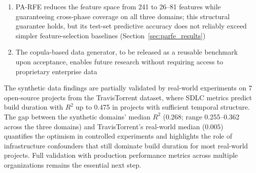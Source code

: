 \documentclass[technologies,article,submit,pdftex,moreauthors]{Definitions/mdpi}
\begin{document}
\begin{enumerate}
  repository age is the \#1 feature in 0 of 7 projects, while Test-phase
  metrics (test duration, test counts, assert density) lead in 5 of 7 --
  no longer a direct real-data contradiction, but a robustness check
  excluding the one Test-phase feature that is definitionally part of
  the build-duration target shows the quantitative signal was doing
  most of the work: with it excluded, every project's holdout \(R^2\)
  turns negative, so this should be read as weak, feature-ranking-only
  corroboration, not confirmation, and it remains a hypothesis pending
  confirmation on a dataset with genuine production-performance (not
  build-duration) targets
\item
  PA-RFE reduces the feature space from 241 to 26--81 features while
  guaranteeing cross-phase coverage on all three domains; this
  structural guarantee holds, but its test-set predictive accuracy does
  not reliably exceed simpler feature-selection baselines (Section~\ref{sec:parfe_results})
\item
  The copula-based data generator, to be released as a reusable
  benchmark upon acceptance, enables future research without requiring
  access to proprietary enterprise data
\end{enumerate}

The synthetic data findings are partially validated by real-world
experiments on 7 open-source projects from the TravisTorrent dataset,
where SDLC metrics predict build duration with \(R^2\) up to 0.475 in
projects with sufficient temporal structure. The gap between the
synthetic domains' median \(R^2\) (0.268; range 0.255--0.362 across the
three domains) and TravisTorrent's real-world median (\(0.005\))
quantifies the optimism in controlled experiments and highlights the
role of infrastructure confounders that still dominate build duration
for most real-world projects. Full validation with production
performance metrics across multiple organizations remains the essential
next step.

\vspace{6pt}

\end{document}
